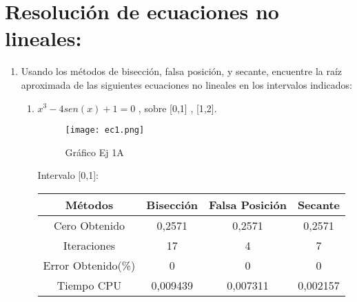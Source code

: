 \documentclass{udpreport}
\begin{document}
\chapter{Resolución de ecuaciones no lineales:}
\begin{enumerate}
\item Usando los métodos de bisección, falsa posición, y secante, encuentre la raíz aproximada 
de las siguientes ecuaciones no lineales en los intervalos indicados:

    \begin{enumerate}
        
    Para realizar estas ecuaciones se utilizaron los programas de :
    \begin{itemize}
        \item Biseccion.m
        \item Secante.m
        \item Falsa.m
    \end{itemize}
    y las comparaciones de error se hicieron en base a el resultado de la función fzero de matlab
    
    \item  \(x^3 - 4sen(x) +1 = 0\) , sobre [0,1] , [1,2].
        \begin{figure}[H]
            \centering
            \texttt{[image: ec1.png]}
             \caption{Gráfico Ej 1A}
        \end{figure}
        
            \begin{table}[H]Intervalo [0,1]:
            \centering
                \begin{tabular} { |c|c|c|c|}
                \hline
                Métodos       & Bisección & Falsa Posición & Secante  \\
                \hline
                Cero Obtenido &  0,2571       &    0,2571      &      0,2571    \\
                \hline
                Iteraciones   &    17        &     4     &       7        \\
                \hline
                Error Obtenido(\%) &       0      &       0      &     0         \\
                \hline
                Tiempo CPU &       0,009439     &      0,007311     &     0,002157         \\
                 \hline
                \end{tabular}
            \end{table}
            

\end{enumerate}
\end{enumerate}
\end{document}
